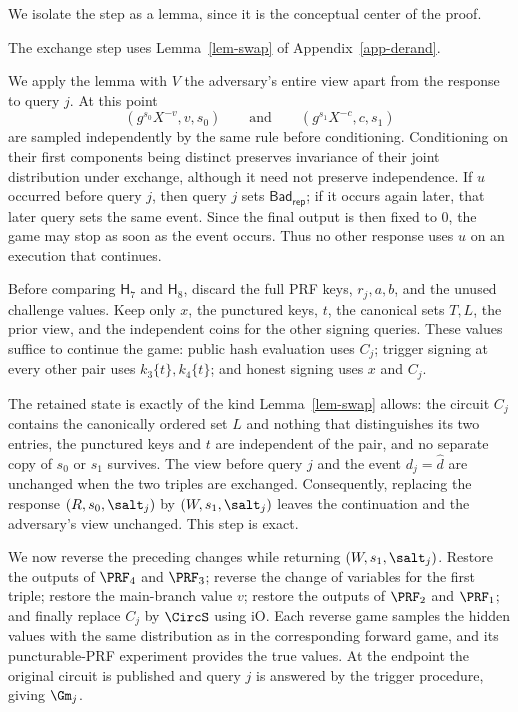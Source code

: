  We isolate the step as a lemma, since it is the conceptual center of the proof.

The exchange step uses Lemma~\ref{lem-swap} of Appendix~\ref{app-derand}.

We apply the lemma with $V$ the adversary's entire view apart from the response to query $j$. At this point
$$
 (g^{s_0}X^{-v},v,s_0)
\qquad\text{and}\qquad
 (g^{s_1}X^{-c},c,s_1)
$$
are sampled independently by the same rule before conditioning. Conditioning on their first components being distinct preserves invariance of their joint distribution under exchange, although it need not preserve independence. If $u$ occurred before query $j$, then query $j$ sets $\mathsf{Bad}_{\mathsf{rep}}$; if it occurs again later, that later query sets the same event. Since the final output is then fixed to 0, the game may stop as soon as the event occurs. Thus no other response uses $u$ on an execution that continues.

Before comparing $\mathsf{H}_7$ and $\mathsf{H}_8$, discard the full PRF keys, $r_j,a,b$, and the unused challenge values. Keep only $x$, the punctured keys, $t$, the canonical sets $T,L$, the prior view, and the independent coins for the other signing queries. These values suffice to continue the game: public hash evaluation uses $C_j$; trigger signing at every other pair uses $k_3\{t\},k_4\{t\}$; and honest signing uses $x$ and $C_j$.

The retained state is exactly of the kind Lemma~\ref{lem-swap} allows: the circuit $C_j$ contains the canonically ordered set $L$ and nothing that distinguishes its two entries, the punctured keys and $t$ are independent of the pair, and no separate copy of $s_0$ or $s_1$ survives. The view before query $j$ and the event $d_j=\widehat d$ are unchanged when the two triples are exchanged. Consequently, replacing the response $(R,s_0,\salt_j)$ by $(W,s_1,\salt_j)$ leaves the continuation and the adversary's view unchanged. This step is exact.

We now reverse the preceding changes while returning $(W,s_1,\salt_j)$. Restore the outputs of $\PRF_4$ and $\PRF_3$; reverse the change of variables for the first triple; restore the main-branch value $v$; restore the outputs of $\PRF_2$ and $\PRF_1$; and finally replace $C_j$ by $\CircS$ using iO. Each reverse game samples the hidden values with the same distribution as in the corresponding forward game, and its puncturable-PRF experiment provides the true values. At the endpoint the original circuit is published and query $j$ is answered by the trigger procedure, giving $\Gm_j$.

